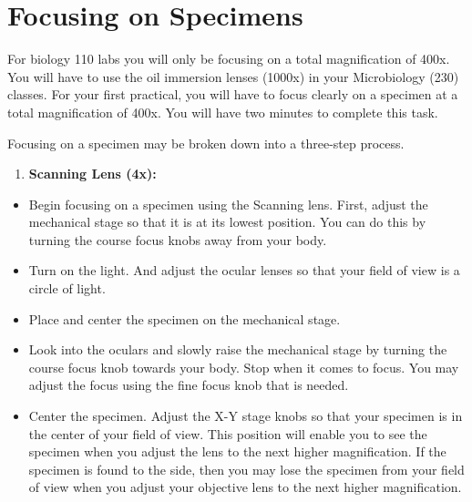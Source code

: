 \documentclass[
  letterpaper,
  DIV=11,
  numbers=noendperiod]{scrreprt}
\providecommand{\tightlist}{%
  \setlength{\itemsep}{0pt}\setlength{\parskip}{0pt}}
\begin{document}
\section{\texorpdfstring{\textbf{Focusing on
Specimens}}{Focusing on Specimens}}\label{focusing-on-specimens}

For biology 110 labs you will only be focusing on a total magnification
of 400x. You will have to use the oil immersion lenses (1000x) in your
Microbiology (230) classes. For your first practical, you will have to
focus clearly on a specimen at a total magnification of 400x. You will
have two minutes to complete this task.

Focusing on a specimen may be broken down into a three-step process.

\begin{enumerate}
\def\labelenumi{\arabic{enumi}.}
\tightlist
\item
  \textbf{Scanning Lens (4x):}
\end{enumerate}

\begin{itemize}
\item
  Begin focusing on a specimen using the Scanning lens. First, adjust
  the mechanical stage so that it is at its lowest position. You can do
  this by turning the course focus knobs away from your body.
\item
  Turn on the light. And adjust the ocular lenses so that your field of
  view is a circle of light.
\item
  Place and center the specimen on the mechanical stage.
\item
  Look into the oculars and slowly raise the mechanical stage by turning
  the course focus knob towards your body. Stop when it comes to focus.
  You may adjust the focus using the fine focus knob that is needed.
\item
  Center the specimen. Adjust the X-Y stage knobs so that your specimen
  is in the center of your field of view. This position will enable you
  to see the specimen when you adjust the lens to the next higher
  magnification. If the specimen is found to the side, then you may lose
  the specimen from your field of view when you adjust your objective
  lens to the next higher magnification.
\end{itemize}
\end{document}
